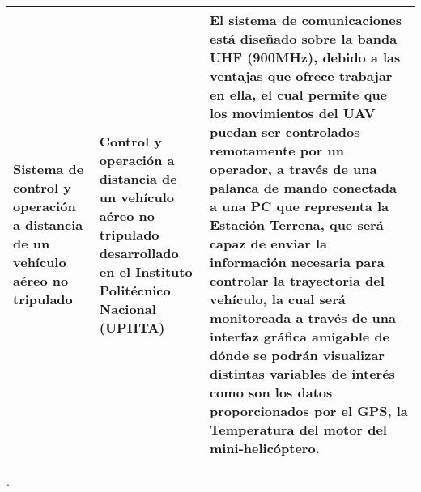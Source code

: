 \begin{longtable}[c]{| p{4cm} | p{4cm} | p{6.5cm} |}
	Sistema de control y operación a distancia de un vehículo aéreo no 
	tripulado &
	Control y operación a distancia de un vehículo aéreo no tripulado
	desarrollado en el Instituto Politécnico Nacional (UPIITA) &
	El sistema de comunicaciones está diseñado sobre la banda UHF (900MHz), 
	debido a las ventajas que ofrece trabajar en ella, el cual permite que 
	los movimientos del UAV puedan ser controlados remotamente por un 
	operador, a través de una palanca de mando conectada a una PC que 
	representa la Estación Terrena, que será capaz de enviar la información 
	necesaria para controlar la trayectoria del vehículo, la cual será 
	monitoreada a través de una interfaz gráfica amigable de dónde se podrán 
	visualizar distintas variables de interés como son los datos 
	proporcionados por el GPS, la Temperatura del motor del 
	mini-helicóptero.
	\\\hline

 \end{longtable}

.
\\ \\
